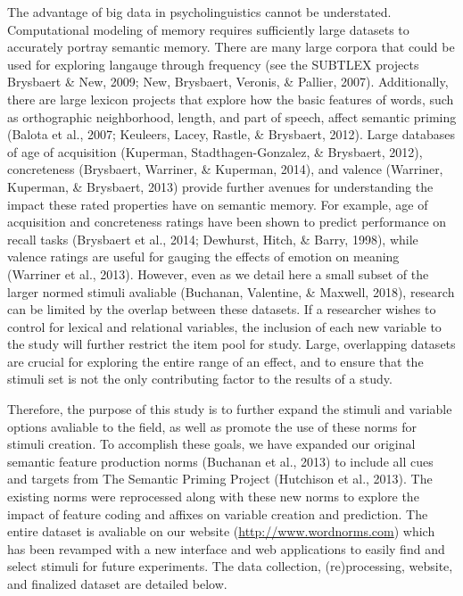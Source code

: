 \documentclass[english,man]{apa6}
\theoremstyle{definition}
\theoremstyle{definition}
\theoremstyle{definition}
\theoremstyle{remark}
\begin{document}
The advantage of big data in psycholinguistics cannot be understated.
Computational modeling of memory requires sufficiently large datasets to
accurately portray semantic memory. There are many large corpora that
could be used for exploring langauge through frequency (see the SUBTLEX
projects Brysbaert \& New, 2009; New, Brysbaert, Veronis, \& Pallier,
2007). Additionally, there are large lexicon projects that explore how
the basic features of words, such as orthographic neighborhood, length,
and part of speech, affect semantic priming (Balota et al., 2007;
Keuleers, Lacey, Rastle, \& Brysbaert, 2012). Large databases of age of
acquisition (Kuperman, Stadthagen-Gonzalez, \& Brysbaert, 2012),
concreteness (Brysbaert, Warriner, \& Kuperman, 2014), and valence
(Warriner, Kuperman, \& Brysbaert, 2013) provide further avenues for
understanding the impact these rated properties have on semantic memory.
For example, age of acquisition and concreteness ratings have been shown
to predict performance on recall tasks (Brysbaert et al., 2014;
Dewhurst, Hitch, \& Barry, 1998), while valence ratings are useful for
gauging the effects of emotion on meaning (Warriner et al., 2013).
However, even as we detail here a small subset of the larger normed
stimuli avaliable (Buchanan, Valentine, \& Maxwell, 2018), research can
be limited by the overlap between these datasets. If a researcher wishes
to control for lexical and relational variables, the inclusion of each
new variable to the study will further restrict the item pool for study.
Large, overlapping datasets are crucial for exploring the entire range
of an effect, and to ensure that the stimuli set is not the only
contributing factor to the results of a study.

Therefore, the purpose of this study is to further expand the stimuli
and variable options avaliable to the field, as well as promote the use
of these norms for stimuli creation. To accomplish these goals, we have
expanded our original semantic feature production norms (Buchanan et
al., 2013) to include all cues and targets from The Semantic Priming
Project (Hutchison et al., 2013). The existing norms were reprocessed
along with these new norms to explore the impact of feature coding and
affixes on variable creation and prediction. The entire dataset is
avaliable on our website (\url{http://www.wordnorms.com}) which has been
revamped with a new interface and web applications to easily find and
select stimuli for future experiments. The data collection,
(re)processing, website, and finalized dataset are detailed below.
\end{document}
